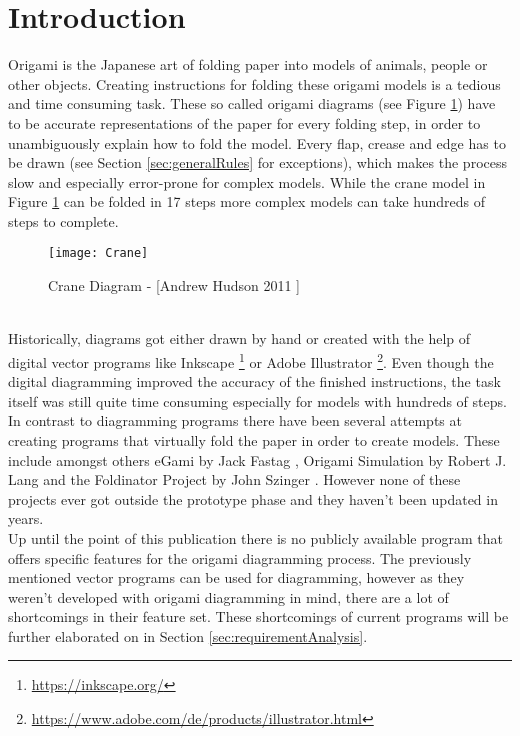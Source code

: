 
\section{Introduction}
\label{sec:introduction}

Origami is the Japanese art of folding paper into models of animals, people or other objects. Creating instructions for folding these \gls{origami} models is a tedious and time consuming task. These so called origami diagrams (see Figure \ref{fig:craneDiagram}) have to be accurate representations of the paper for every folding step, in order to unambiguously explain how to fold the model. Every flap, crease and edge has to be drawn (see Section \ref{sec:generalRules} for exceptions), which makes the process slow and especially error-prone for complex models. While the crane model in Figure \ref{fig:craneDiagram} can be folded in 17 steps more complex models can take hundreds of steps to complete.\\
\begin{figure}[htbp]
	\centering
	\texttt{[image: Crane]}
	\caption[Crane Diagram]{Crane Diagram - [Andrew Hudson 2011 \cite{Hudson}]}
	\label{fig:craneDiagram}
\end{figure}\\
Historically, diagrams got either drawn by hand or created with the help of digital vector programs like Inkscape \footnote{\url{https://inkscape.org/}} or Adobe Illustrator \footnote{\url{https://www.adobe.com/de/products/illustrator.html}}. Even though the digital diagramming improved the accuracy of the finished instructions, the task itself was still quite time consuming especially for models with hundreds of steps.\\
In contrast to diagramming programs there have been several attempts at creating programs that virtually fold the paper in order to create models. These include amongst others eGami by Jack Fastag \cite{eGami}, Origami Simulation by Robert J. Lang \cite{origamiSimulation} and the Foldinator Project by John Szinger \cite{foldinator}. However none of these projects ever got outside the prototype phase and they haven't been updated in years.\\
Up until the point of this publication there is no publicly available program that offers specific features for the origami diagramming process.  The previously mentioned vector programs can be used for diagramming, however as they weren't developed with origami diagramming in mind, there are a lot of shortcomings in their feature set. These shortcomings of current programs will be further elaborated on in Section \ref{sec:requirementAnalysis}.\\
